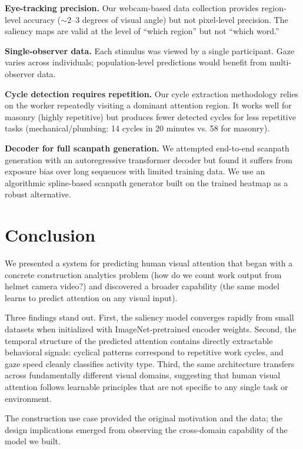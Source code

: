 \documentclass{article}
\begin{document}
\textbf{Eye-tracking precision.} Our webcam-based data collection provides region-level accuracy ($\sim$2--3 degrees of visual angle) but not pixel-level precision. The saliency maps are valid at the level of ``which region'' but not ``which word.''

\textbf{Single-observer data.} Each stimulus was viewed by a single participant. Gaze varies across individuals; population-level predictions would benefit from multi-observer data.

\textbf{Cycle detection requires repetition.} Our cycle extraction methodology relies on the worker repeatedly visiting a dominant attention region. It works well for masonry (highly repetitive) but produces fewer detected cycles for less repetitive tasks (mechanical/plumbing: 14 cycles in 20 minutes vs. 58 for masonry).

\textbf{Decoder for full scanpath generation.} We attempted end-to-end scanpath generation with an autoregressive transformer decoder but found it suffers from exposure bias over long sequences with limited training data. We use an algorithmic spline-based scanpath generator built on the trained heatmap as a robust alternative.

\section{Conclusion}

We presented a system for predicting human visual attention that began with a concrete construction analytics problem (how do we count work output from helmet camera video?) and discovered a broader capability (the same model learns to predict attention on any visual input).

Three findings stand out. First, the saliency model converges rapidly from small datasets when initialized with ImageNet-pretrained encoder weights. Second, the temporal structure of the predicted attention contains directly extractable behavioral signals: cyclical patterns correspond to repetitive work cycles, and gaze speed cleanly classifies activity type. Third, the same architecture transfers across fundamentally different visual domains, suggesting that human visual attention follows learnable principles that are not specific to any single task or environment.

The construction use case provided the original motivation and the data; the design implications emerged from observing the cross-domain capability of the model we built.



\end{document}
